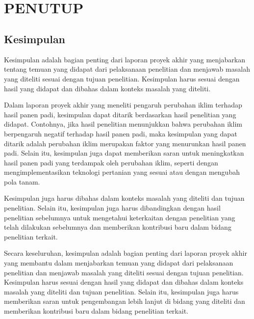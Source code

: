 
\chapter[PENUTUP]{\\ PENUTUP}

\section{Kesimpulan}
Kesimpulan adalah bagian penting dari laporan proyek akhir yang menjabarkan tentang temuan yang didapat dari pelaksanaan penelitian dan menjawab masalah yang diteliti sesuai dengan tujuan penelitian. Kesimpulan harus sesuai dengan hasil yang didapat dan dibahas dalam konteks masalah yang diteliti.

Dalam laporan proyek akhir yang meneliti pengaruh perubahan iklim terhadap hasil panen padi, kesimpulan dapat ditarik berdasarkan hasil penelitian yang didapat. Contohnya, jika hasil penelitian menunjukkan bahwa perubahan iklim berpengaruh negatif terhadap hasil panen padi, maka kesimpulan yang dapat ditarik adalah perubahan iklim merupakan faktor yang menurunkan hasil panen padi. Selain itu, kesimpulan juga dapat memberikan saran untuk meningkatkan hasil panen padi yang terdampak oleh perubahan iklim, seperti dengan mengimplementasikan teknologi pertanian yang sesuai atau dengan mengubah pola tanam.

Kesimpulan juga harus dibahas dalam konteks masalah yang diteliti dan tujuan penelitian. Selain itu, kesimpulan juga harus dibandingkan dengan hasil penelitian sebelumnya untuk mengetahui keterkaitan dengan penelitian yang telah dilakukan sebelumnya dan memberikan kontribusi baru dalam bidang penelitian terkait.

Secara keseluruhan, kesimpulan adalah bagian penting dari laporan proyek akhir yang membantu dalam menjabarkan temuan yang didapat dari pelaksanaan penelitian dan menjawab masalah yang diteliti sesuai dengan tujuan penelitian. Kesimpulan harus sesuai dengan hasil yang didapat dan dibahas dalam konteks masalah yang diteliti dan tujuan penelitian. Selain itu, kesimpulan juga harus memberikan saran untuk pengembangan lebih lanjut di bidang yang diteliti dan memberikan kontribusi baru dalam bidang penelitian terkait.


